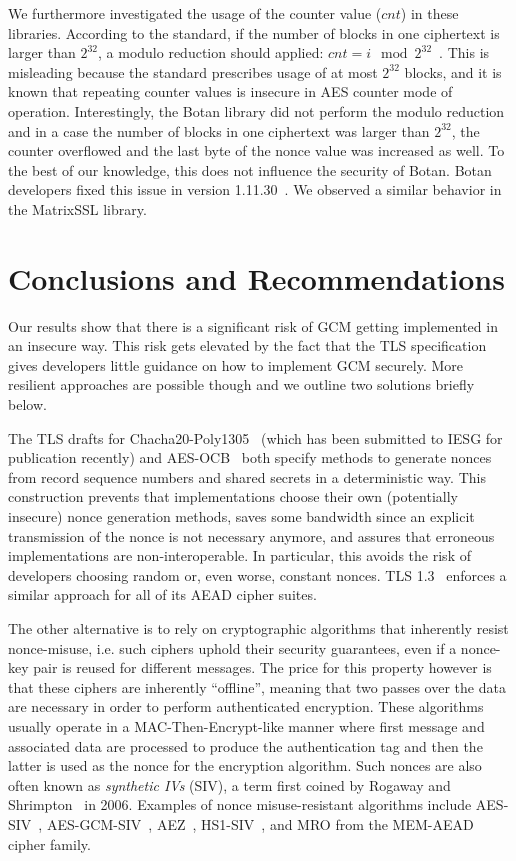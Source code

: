 We furthermore investigated the usage of the counter value ($cnt$) in these libraries. According to the standard,
if the number of blocks in one ciphertext is larger than $2^{32}$, a modulo reduction should applied: $cnt = i \mod{2^{32}}$~\cite{gcm}.
This is misleading because the standard prescribes usage of at most $2^{32}$ blocks, and it is known that repeating counter values is insecure in AES counter mode of operation.
Interestingly, the Botan library did not perform the modulo reduction and in a case the number of blocks in one ciphertext
was larger than $2^{32}$, the counter overflowed and the last byte of the nonce value was increased as well. To the best of our knowledge,
this does not influence the security of Botan. Botan developers fixed this issue in version 1.11.30~\cite{botanfix}.
We observed a similar behavior in the MatrixSSL library.

\section{Conclusions and Recommendations}
Our results show that there is a significant risk of GCM getting implemented in an insecure way. This risk gets elevated by the fact that the TLS specification
gives developers little guidance on how to implement GCM securely. More resilient approaches are possible though and we outline two solutions briefly below.

The TLS drafts for Chacha20-Poly1305~\cite{draft-chacha-langely} (which has been submitted to IESG for publication recently) and AES-OCB~\cite{draft-ocb-zauner} both specify methods to generate nonces
from record sequence numbers and shared secrets in a deterministic way.
This construction prevents that implementations choose their own (potentially insecure) nonce generation methods, saves some bandwidth since an explicit transmission of the nonce
is not necessary anymore, and assures that erroneous implementations are non-interoperable. In particular, this avoids the risk of developers choosing random or, even worse, constant nonces.
TLS 1.3~\cite{draft-tls13-rescorla} enforces a similar approach for all of its AEAD cipher suites. 


The other alternative is to rely on cryptographic algorithms that inherently resist nonce-misuse, i.e.
such ciphers uphold their security guarantees, even if a nonce-key pair is reused for different messages.
The price for this property however is that these ciphers are inherently ``offline'',
meaning that two passes over the data are necessary in order to perform authenticated encryption.
These algorithms usually operate in a MAC-Then-Encrypt-like manner where
first message and associated data are processed to produce the authentication tag and then the latter is used as the nonce for the encryption algorithm.
Such nonces are also often known as \emph{synthetic IVs} (SIV), a term first coined by Rogaway and Shrimpton~\cite{EPRINT:RogShr06} in 2006.
Examples of nonce misuse-resistant algorithms include AES-SIV~\cite{rfc5297}, AES-GCM-SIV~\cite{gcm-siv}, AEZ~\cite{EC:HoaKroRog15}, HS1-SIV~\cite{HS1SIV14}, and MRO from the MEM-AEAD~\cite{granger2016} cipher family.

